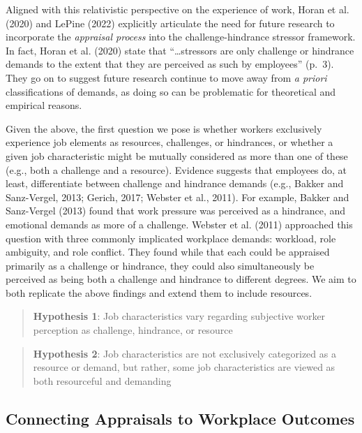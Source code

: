 \documentclass[
  man]{apa7}
\begin{document}
Aligned with this relativistic perspective on the experience of work, Horan et al. (2020) and LePine (2022) explicitly articulate the need for future research to incorporate the \emph{appraisal process} into the challenge-hindrance stressor framework. In fact, Horan et al. (2020) state that ``\ldots stressors are only challenge or hindrance demands to the extent that they are perceived as such by employees'' (p.~3). They go on to suggest future research continue to move away from \emph{a priori} classifications of demands, as doing so can be problematic for theoretical and empirical reasons.

Given the above, the first question we pose is whether workers exclusively experience job elements as resources, challenges, or hindrances, or whether a given job characteristic might be mutually considered as more than one of these (e.g., both a challenge and a resource). Evidence suggests that employees do, at least, differentiate between challenge and hindrance demands (e.g., Bakker and Sanz-Vergel, 2013; Gerich, 2017; Webster et al., 2011). For example, Bakker and Sanz-Vergel (2013) found that work pressure was perceived as a hindrance, and emotional demands as more of a challenge. Webster et al. (2011) approached this question with three commonly implicated workplace demands: workload, role ambiguity, and role conflict. They found while that each could be appraised primarily as a challenge or hindrance, they could also simultaneously be perceived as being both a challenge and hindrance to different degrees. We aim to both replicate the above findings and extend them to include resources.

\begin{quote}
\textbf{Hypothesis 1}: Job characteristics vary regarding subjective worker perception as challenge, hindrance, or resource
\end{quote}

\begin{quote}
\textbf{Hypothesis 2}: Job characteristics are not exclusively categorized as a resource or demand, but rather, some job characteristics are viewed as both resourceful and demanding
\end{quote}

\subsection{Connecting Appraisals to Workplace Outcomes}\label{connecting-appraisals-to-workplace-outcomes}
\end{document}
